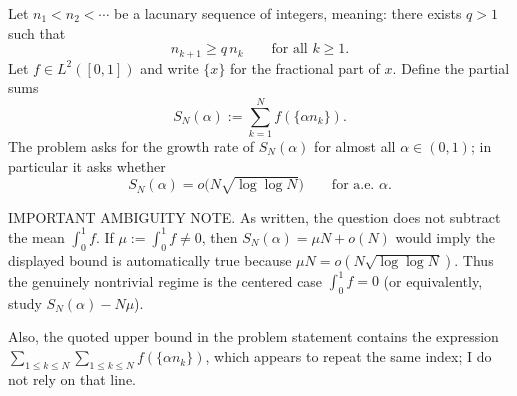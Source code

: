 Let $n_1<n_2<\cdots$ be a lacunary sequence of integers, meaning: there exists $q>1$ such that
\[
 n_{k+1}\ge q\,n_k\qquad\text{for all }k\ge 1.
\]
Let $f\in L^2([0,1])$ and write $\{x\}$ for the fractional part of $x$.
Define the partial sums
\[
 S_N(\alpha):=\sum_{k=1}^N f(\{\alpha n_k\}).
\]
The problem asks for the growth rate of $S_N(\alpha)$ for almost all $\alpha\in(0,1)$; in particular it asks whether
\[
 S_N(\alpha)=o\bigl(N\sqrt{\log\log N}\bigr)\qquad\text{for a.e. }\alpha.
\]

IMPORTANT AMBIGUITY NOTE.
As written, the question does not subtract the mean $\int_0^1 f$.  If $\mu:=\int_0^1 f\neq 0$, then $S_N(\alpha)=\mu N+o(N)$ would imply the displayed bound is automatically true because $\mu N = o(N\sqrt{\log\log N})$.  Thus the genuinely nontrivial regime is the centered case $\int_0^1 f=0$ (or equivalently, study $S_N(\alpha)-N\mu$).

Also, the quoted upper bound in the problem statement contains the expression $\sum_{1\le k\le N}\sum_{1\le k\le N}f(\{\alpha n_k\})$, which appears to repeat the same index; I do not rely on that line.
